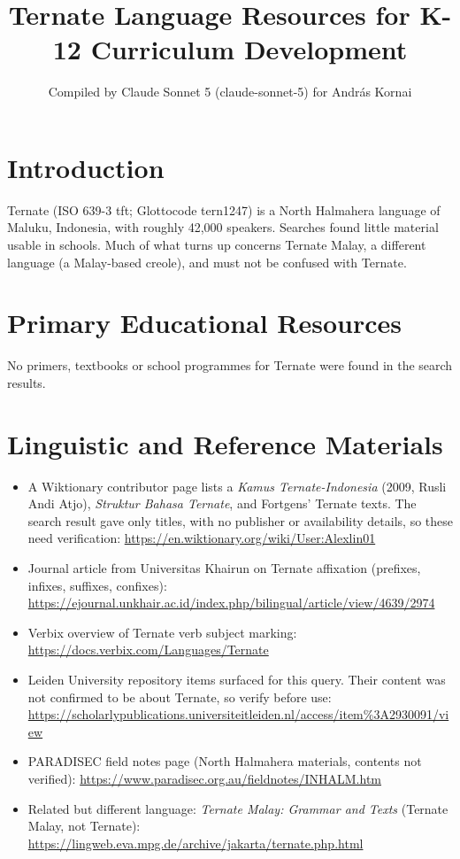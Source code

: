 \documentclass[12pt]{article}
\title{Ternate Language Resources for K-12 Curriculum Development}
\author{Compiled by Claude Sonnet 5 (claude-sonnet-5) for Andr\'as Kornai}
\date{}
\begin{document}
\maketitle

\section{Introduction}
Ternate (ISO 639-3 tft; Glottocode tern1247) is a North Halmahera language of Maluku, Indonesia, with roughly 42,000 speakers. Searches found little material usable in schools. Much of what turns up concerns Ternate Malay, a different language (a Malay-based creole), and must not be confused with Ternate.

\section{Primary Educational Resources}
No primers, textbooks or school programmes for Ternate were found in the search results.

\section{Linguistic and Reference Materials}
\begin{itemize}
\item A Wiktionary contributor page lists a \emph{Kamus Ternate-Indonesia} (2009, Rusli Andi Atjo), \emph{Struktur Bahasa Ternate}, and Fortgens' Ternate texts. The search result gave only titles, with no publisher or availability details, so these need verification: \url{https://en.wiktionary.org/wiki/User:Alexlin01}
\item Journal article from Universitas Khairun on Ternate affixation (prefixes, infixes, suffixes, confixes): \url{https://ejournal.unkhair.ac.id/index.php/bilingual/article/view/4639/2974}
\item Verbix overview of Ternate verb subject marking: \url{https://docs.verbix.com/Languages/Ternate}
\item Leiden University repository items surfaced for this query. Their content was not confirmed to be about Ternate, so verify before use: \url{https://scholarlypublications.universiteitleiden.nl/access/item%3A2930091/view}
\item PARADISEC field notes page (North Halmahera materials, contents not verified): \url{https://www.paradisec.org.au/fieldnotes/INHALM.htm}
\item Related but different language: \emph{Ternate Malay: Grammar and Texts} (Ternate Malay, not Ternate): \url{https://lingweb.eva.mpg.de/archive/jakarta/ternate.php.html}
\end{itemize}
\end{document}
